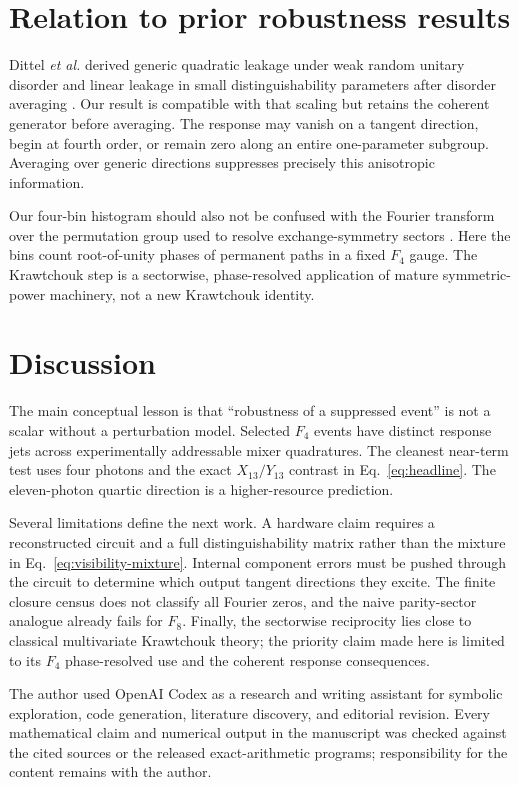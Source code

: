 \documentclass[aps,pra,reprint,amsmath,amssymb,superscriptaddress,longbibliography]{revtex4-2}
\begin{document}
\section{Relation to prior robustness results}

Dittel \emph{et al.} derived generic quadratic leakage under weak random
unitary disorder and linear leakage in small distinguishability parameters
after disorder averaging \cite{Dittel2018PRL}.  Our result is compatible
with that scaling but retains the coherent generator before averaging.
The response may vanish on a tangent direction, begin at fourth order, or
remain zero along an entire one-parameter subgroup.  Averaging over generic
directions suppresses precisely this anisotropic information.

Our four-bin histogram should also not be confused with the Fourier
transform over the permutation group used to resolve exchange-symmetry
sectors \cite{DufourBuchleitner2026}.  Here the bins count root-of-unity
phases of permanent paths in a fixed $F_4$ gauge.  The Krawtchouk step is a
sectorwise, phase-resolved application of mature symmetric-power machinery,
not a new Krawtchouk identity.

\section{Discussion}

The main conceptual lesson is that ``robustness of a suppressed event'' is
not a scalar without a perturbation model.  Selected $F_4$ events have
distinct response jets across experimentally addressable mixer
quadratures.  The cleanest near-term test uses four photons and the exact
$X_{13}/Y_{13}$ contrast in Eq.~\eqref{eq:headline}.  The
eleven-photon quartic direction is a higher-resource prediction.

Several limitations define the next work.  A hardware claim requires a
reconstructed circuit and a full distinguishability matrix rather than the
mixture in Eq.~\eqref{eq:visibility-mixture}.  Internal component errors
must be pushed through the circuit to determine which output tangent
directions they excite.  The finite closure census does not classify all
Fourier zeros, and the naive parity-sector analogue already fails for
$F_8$.  Finally, the sectorwise reciprocity lies close to classical
multivariate Krawtchouk theory; the priority claim made here is limited to
its $F_4$ phase-resolved use and the coherent response consequences.

\begin{acknowledgments}
The author used OpenAI Codex as a research and writing assistant for
symbolic exploration, code generation, literature discovery, and editorial
revision.  Every mathematical claim and numerical output in the manuscript
was checked against the cited sources or the released exact-arithmetic
programs; responsibility for the content remains with the author.
\end{acknowledgments}
\end{document}
